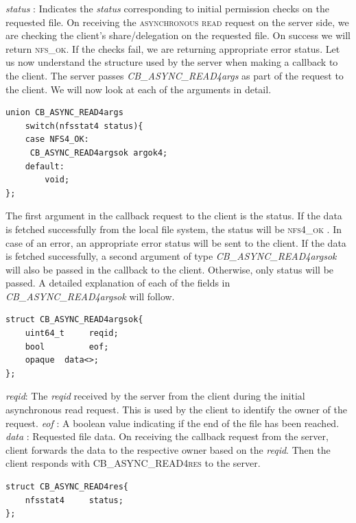 \textit{status} : Indicates the \textit{status} corresponding to initial permission checks on the requested file.
On receiving the \textsc{asynchronous read} request on the server side, we are checking the client's share/delegation on the requested file. On success we will return \textsc{nfs}\textsc{\_ok}.  If the checks fail, we are returning appropriate error status.
\hfill \break \newline
\noindent Let us now understand the structure used by the server when making a callback to the client. The server passes \textit{CB\_ASYNC\_READ4args} as part of the request to the client. We will now look at each of the arguments in detail. 
\begin{lstlisting}
union CB_ASYNC_READ4args 
	switch(nfsstat4 status){
	case NFS4_OK:
	 CB_ASYNC_READ4argsok argok4;
 	default:
		void;
};
\end{lstlisting}

\noindent The first argument in the callback request to the client is the status. If the data is fetched successfully from the local file system, the status will be \textsc{nfs4\_ok} . In case of an error, an appropriate error status will be sent to the client. If the data is fetched successfully, a second argument of type \textit{CB\_ASYNC\_READ4argsok} will also be passed in the callback to the client. Otherwise, only status will be passed. A detailed explanation of each of the fields in \textit{CB\_ASYNC\_READ4argsok} will follow.

\begin{lstlisting}
struct CB_ASYNC_READ4argsok{
	uint64_t	 reqid;
	bool		 eof;
	opaque	data<>;
};
\end{lstlisting}

\noindent\textit{reqid}: The \textit{reqid} received by the server from the client during the initial asynchronous read request. This is used by the client to identify the owner of the request.
\hfill \break \newline
\noindent\textit{eof} : A boolean value indicating if the end of the file has been reached.
\hfill \break \newline
\noindent\textit{data} : Requested file data.
\hfill \break \newline
\noindent On receiving the callback request from the server, client forwards the data to the respective owner based on the \textit{reqid}. Then the client responds with \textsc{CB\_ASYNC\_READ4res} to the server.
 
\begin{lstlisting}
struct CB_ASYNC_READ4res{
	nfsstat4	 status;
};
\end{lstlisting}

